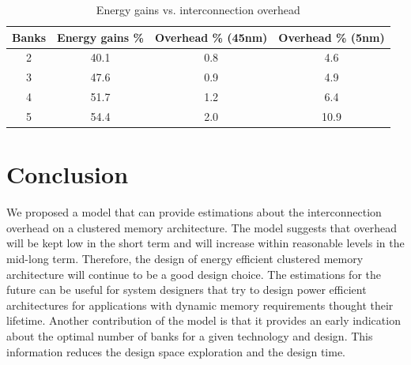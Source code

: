 \begin{center}
	\begin{table}
	\caption{Energy gains vs. interconnection overhead}
	\label{tab:GainvsOverhead}
	{
	\begin{tabular}{|c|c|c|c|}
	\hline
	Banks & Energy gains \% & Overhead \% (45nm) & Overhead \% (5nm) \\
	\hline
	2 & 40.1  & 0.8 & 4.6 \\
	\hline 
	3 & 47.6  & 0.9 & 4.9 \\
	\hline 
	4 & 51.7 & 1.2 & 6.4 \\
	\hline
	5 & 54.4 & 2.0 & 10.9 \\
	\hline	
	\end{tabular}}
	\end{table}
\end{center}
  
\section{Conclusion}
\label{conclusionE}

We proposed a model that can provide estimations about the interconnection overhead on a clustered memory architecture.
The model suggests that overhead will be kept low in the short term and will increase within reasonable levels in the mid-long term.
Therefore, the design of energy efficient clustered memory architecture will continue to be a good design choice.
The estimations for the future can be useful for system designers that try to design power efficient architectures for applications with dynamic memory requirements thought their lifetime.
Another contribution of the model is that it provides an early indication about the optimal number of banks for a given technology and design.
This information reduces the design space exploration and the design time. 




%
